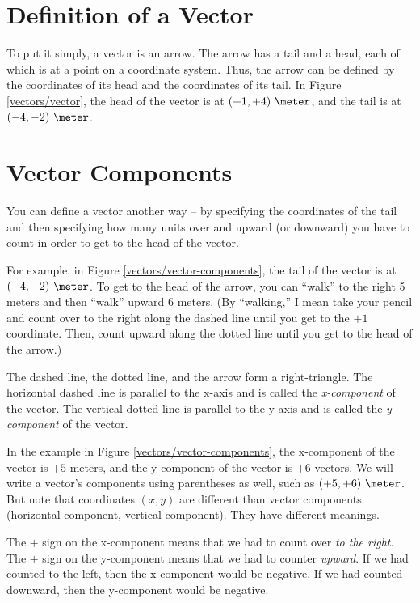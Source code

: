 
\section*{Definition of a Vector}

To put it simply, a vector is an arrow. The arrow has a tail and a head, each of which is at a point on a coordinate system. Thus, the arrow can be defined by the coordinates of its head and the coordinates of its tail. In Figure \ref{vectors/vector}, the head of the vector is at $(+1,+4)\ \meter$, and the tail is at $(-4,-2)\ \meter$.



\section*{Vector Components}

You can define a vector another way -- by specifying the coordinates of the tail and then specifying how many units over and upward (or downward) you have to count in order to get to the head of the vector. 

For example, in Figure \ref{vectors/vector-components}, the tail of the vector is at $(-4,-2)\ \meter$. To get to the head of the arrow, you can ``walk'' to the right 5 meters and then ``walk'' upward 6 meters. (By ``walking,'' I mean take your pencil and count over to the right along the dashed line until you get to the $+1$ coordinate. Then, count upward along the dotted line until you get to the head of the arrow.)


The dashed line, the dotted line, and the arrow form a right-triangle. The horizontal dashed line is parallel to the x-axis and is called the \emph{x-component} of the vector. The vertical dotted line is parallel to the y-axis and is called the \emph{y-component} of the vector. 

In the example in Figure \ref{vectors/vector-components}, the x-component of the vector is $+5$ meters, and the y-component of the vector is $+6$ vectors. We will write a vector's components using parentheses as well, such as $(+5,+6)\ \meter$. But note that coordinates $(x,y)$ are different than vector components (horizontal component, vertical component). They have different meanings.

The $+$ sign on the x-component means that we had to count over \emph{to the right}. The $+$ sign on the y-component means that we had to counter \emph{upward}. If we had counted to the left, then the x-component would be negative. If we had counted downward, then the y-component would be negative. 


